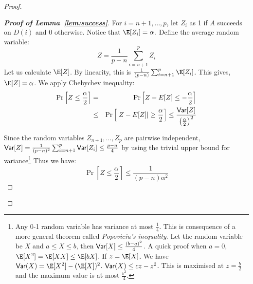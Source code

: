 \begin{proof}
\begin{proof}[{\em \textbf{Proof of Lemma~\ref{lem:success}}}]
 For $i=n+1, \ldots, p$, let $Z_i$ as 1 if $A$ succeeds on $D(i)$ and $0$ otherwise. Notice that $\E[Z_i] = \alpha$. Define the average random variable:
$$Z = \frac{1}{p-n}\sum_{i=n+1}^p Z_i$$
Let us calculate $\E[Z]$. By linearity, this is $\frac{1}{(p-n)}\sum_{i=n+1}^p \E[Z_i]$. This gives, $\E[Z] = \alpha$. We apply Chebychev inequality:
\begin{eqnarray*}
\Pr\left[Z \le \frac{\alpha}{2}\right] & = & \Pr\left[Z-E[Z] \le -\frac{\alpha}{2}\right] \\
& \le & \Pr\left[\left|Z-E[Z]\right| \ge \frac{\alpha}{2}\right] \le \frac{{\sf Var}[Z]}{\left(\frac{\alpha}{2}\right)^2}
\end{eqnarray*}

Since the random variables $Z_{n+1},\ldots, Z_p$ are pairwise independent, ${\sf Var}[Z] = \frac{1}{(p-n)^2}\sum_{i=n+1}^p {\sf Var}[Z_i] \le \frac{p-n}{4}$ by using the trivial upper bound for variance\footnote{Any 0-1 random variable has variance at most $\frac{1}{4}$. This is consequence of a more general theorem called 
\textit{Popoviciu's inequality}. Let the random variable be $X$ and $a \le X \le b$, then ${\sf Var}[X] \le \frac{(b-a)^2}{4}$. A quick proof when $a=0$, $\E[X^2] = \E[XX] \le \E[bX]$. If $z = \E[X]$. We have ${\sf Var}(X) = \E[X^2] - (\E[X])^2$. ${\sf Var}(X) \le cz - z^2$. This is maximised at $z = \frac{b}{2}$ and the maximum value is at most $\frac{b^2}{4}$.} Thus we have:
$$\Pr\left[Z \le \frac{\alpha}{2}\right] \le \frac{1}{(p-n)\alpha^2}$$
\end{proof}


\end{proof}
